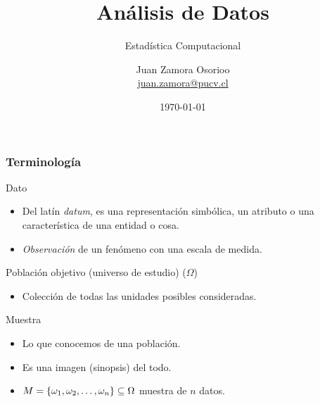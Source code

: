 \documentclass[table]{beamer}
\title{Análisis de Datos}
\subtitle{Estadística Computacional}
\author[J.Z.O-2023]{Juan Zamora Osorioo\\\url{juan.zamora@pucv.cl}}
\institute[PUCV]{Instituto de Estadística\\Pontificia Universidad Cat\'olica de Valpara\'iso}
\date{\today}
\begin{document}
\begin{frame}[plain]
    \titlepage
\end{frame}





\begin{frame}
    \frametitle{Terminología}
    \begin{block}{Dato}
        \begin{itemize}
            \item Del latín \emph{datum}, es una representación simbólica, un atributo o una característica de una entidad o cosa.
            \item \emph{Observación} de un fenómeno con una escala de medida.
        \end{itemize}
    \end{block}
    \begin{block}{Población objetivo (universo de estudio) ($\Omega$)}
        \begin{itemize}
            \item Colección de todas las unidades posibles consideradas.
        \end{itemize}
    \end{block}
    \begin{block}{Muestra}
        \begin{itemize}
            \item Lo que conocemos de una población.
            \item Es una imagen (sinopsis) del todo.
            \item $M = \bparens{\omega_{1} , \omega_{2} , \ldots , \omega_{n}} \subseteq \Omega$ muestra de $n$ datos.
        \end{itemize}
    \end{block}
\end{frame}
\end{document}
